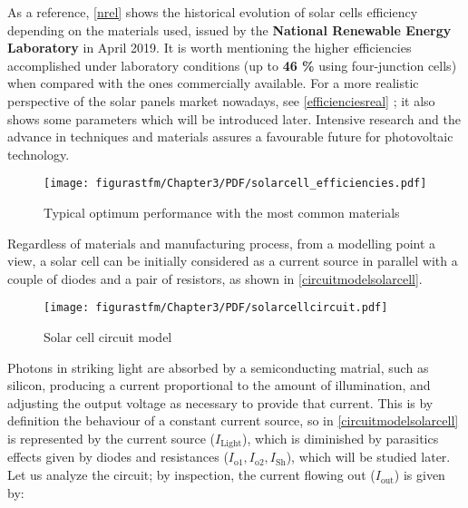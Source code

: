 			As a reference, \autoref{nrel} shows the historical evolution of solar cells efficiency depending on the materials used, issued by the \textbf{National Renewable Energy Laboratory} in April 2019. It is worth mentioning the higher efficiencies accomplished under laboratory conditions (up to \textbf{46 \%} using four-junction cells) when compared with the ones commercially available.  For a more realistic perspective of the solar panels market nowadays, see \autoref{efficienciesreal} \cite{phandphoto}; it also shows some parameters which will be introduced later. Intensive research and the advance in techniques and materials assures a favourable future for photovoltaic technology. 	
			
			\begin{figure}[H]
			\centering
			\texttt{[image: figurastfm/Chapter3/PDF/solarcell\_efficiencies.pdf]}
			\caption{Typical optimum performance with the most common materials \cite{phandphoto}} \label{efficienciesreal}
\end{figure}
			

			Regardless of materials and manufacturing process, from a modelling point a view, a solar cell can be initially considered as a current source in parallel with a couple of diodes and a pair of resistors, as shown in \autoref{circuitmodelsolarcell}.
			
						
				\begin{figure} [H] 
				\centering
				\texttt{[image: figurastfm/Chapter3/PDF/solarcellcircuit.pdf]}
				\caption{Solar cell circuit model} 		
				\label{circuitmodelsolarcell}
			\end{figure}
			
			Photons in striking light are absorbed by a semiconducting matrial, such as silicon, producing a current proportional to the amount of illumination, and adjusting the output voltage as necessary to provide that current. This is by definition the behaviour of a constant current source, so in \autoref{circuitmodelsolarcell} is represented by the current source ($I_{\text{Light}}$), which is diminished by parasitics effects given by diodes and resistances ($I_{\text{o1}},I_{\text{o2}},I_{\text{Sh}}$), which will be studied later. Let us analyze the circuit; by inspection, the current flowing out ($I_{\text{out}}$) is given by:
			
